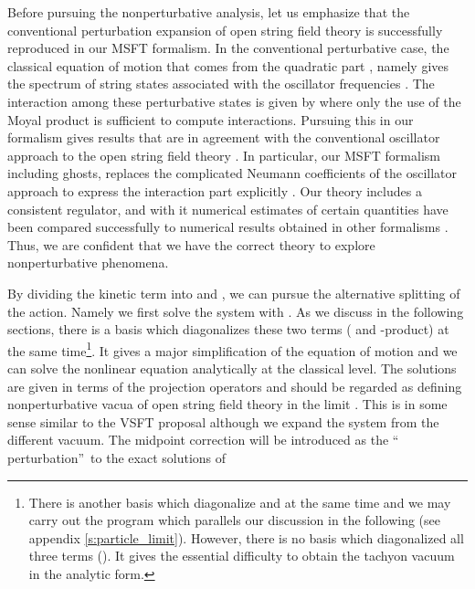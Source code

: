 \documentclass[a4paper,aps,preprint,nofootinbib,eqsecnum]{revtex4}
\begin{document}
Before pursuing the nonperturbative analysis, let us emphasize that the
conventional perturbation expansion of open string field theory is
successfully reproduced in our MSFT formalism. In the conventional
perturbative case, the classical equation of motion that comes from the
quadratic part \coordHE{}, namely \coordHE{} gives the
spectrum of string states associated with the oscillator frequencies \coordHE{} \cite{BM2}\cite{BKM1}. The interaction among
these perturbative states is given by \coordHE{} where only the use of the
Moyal product is sufficient to compute interactions. Pursuing this in our
formalism gives results that are in agreement with the conventional
oscillator approach to the open string field theory \cite{GJ}. In
particular, our MSFT formalism including ghosts, replaces the complicated
Neumann coefficients of the oscillator approach to express the interaction
part explicitly \cite{BM2}\cite{PREP}. Our theory includes a consistent
regulator, and with it numerical estimates of certain quantities have been
compared successfully to numerical results obtained in other formalisms \cite%
{PREP}. Thus, we are confident that we have the correct theory to explore
nonperturbative phenomena.

By dividing the kinetic term into \coordHE{} and \coordHE{}, we can pursue the
alternative splitting of the action. Namely we first solve the system with \coordHE{}. As we discuss in the following sections, there is a basis
which diagonalizes these two terms (\coordHE{} and \myHighlight{$\star $}\coordHE{}%
-product) at the same time\footnote{%
There is another basis which diagonalize \coordHE{} and \coordHE{} at the same
time and we may carry out the program which parallels our discussion in the
following (see appendix \ref{s:particle_limit}). However, there is no basis
which diagonalized all three terms \coordHE{} (\coordHE{}). It gives the
essential difficulty to obtain the tachyon vacuum in the analytic form.}. It
gives a major simplification of the equation of motion and we can solve the
nonlinear equation analytically at the classical level. The solutions are
given in terms of the projection operators and should be regarded as
defining nonperturbative vacua of open string field theory in the limit \coordHE{}. This is in some sense similar to the VSFT proposal \cite%
{VSFT} although we expand the system from the different vacuum. The midpoint
correction \coordHE{} will be introduced as the \textquotedblleft
perturbation\textquotedblright\ to the exact solutions of \coordHE{}
\end{document}
